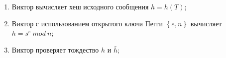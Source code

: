 \begin{enumerate}

\item Виктор вычисляет хеш исходного сообщения $h = h(T)$;
\item Виктор с использованием открытого ключа Пегги $\left\{e,n\right\}$ вычисляет
$\bar{h} = s^e \ mod \ n$;
\item Виктор проверяет тождество $h$ и $\bar{h}$;

\end{enumerate}